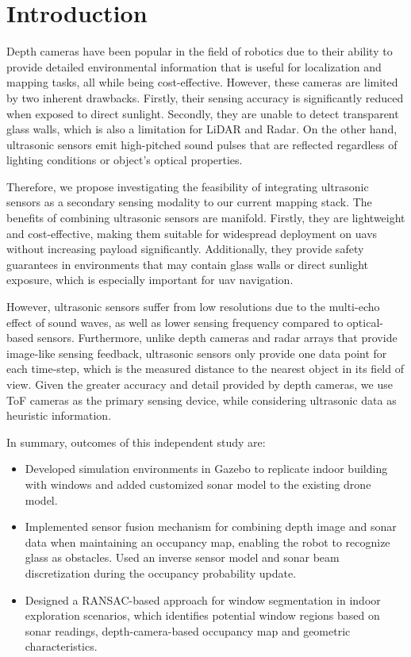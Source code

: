 \section{Introduction}
\label{sec:intro}

Depth cameras have been popular in the field of robotics due to their ability to provide detailed environmental information that is useful for localization and mapping tasks, all while being cost-effective. However, these cameras are limited by two inherent drawbacks. Firstly, their sensing accuracy is significantly reduced when exposed to direct sunlight. Secondly, they are unable to detect transparent glass walls, which is also a limitation for LiDAR and Radar. On the other hand, ultrasonic sensors emit high-pitched sound pulses that are reflected regardless of lighting conditions or object's optical properties.

Therefore, we propose investigating the feasibility of integrating ultrasonic sensors as a secondary sensing modality to our current mapping stack. The benefits of combining ultrasonic sensors are manifold. Firstly, they are lightweight and cost-effective, making them suitable for widespread deployment on \glspl{uav} without increasing payload significantly. Additionally, they provide safety guarantees in environments that may contain glass walls or direct sunlight exposure, which is especially important for \gls{uav} navigation.

However, ultrasonic sensors suffer from low resolutions due to the multi-echo effect of sound waves, as well as lower sensing frequency compared to optical-based sensors. Furthermore, unlike depth cameras and radar arrays that provide image-like sensing feedback, ultrasonic sensors only provide one data point for each time-step, which is the measured distance to the nearest object in its field of view. Given the greater accuracy and detail provided by depth cameras, we use ToF cameras as the primary sensing device, while considering ultrasonic data as heuristic information. 

In summary, outcomes of this independent study are:
\begin{itemize}
    \item Developed simulation environments in Gazebo to replicate indoor building with windows and added customized sonar model to the existing drone model.
    \item Implemented sensor fusion mechanism for combining depth image and sonar data when maintaining an occupancy map, enabling the robot to recognize glass as obstacles. Used an inverse sensor model and sonar beam discretization during the occupancy probability update.
    \item Designed a RANSAC-based approach for window segmentation in indoor exploration scenarios, which identifies potential window regions based on sonar readings, depth-camera-based occupancy map and geometric characteristics.
\end{itemize}






